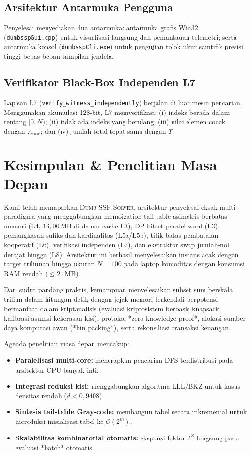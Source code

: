 \documentclass[journal,onecolumn,11pt]{IEEEtran}
\begin{document}
\subsection{Arsitektur Antarmuka Pengguna}
Penyelesai menyediakan dua antarmuka: antarmuka grafis Win32 (\texttt{dumbsspGui.cpp}) untuk visualisasi langsung dan pemantauan telemetri; serta antarmuka konsol (\texttt{dumbsspCli.exe}) untuk pengujian tolok ukur saintifik presisi tinggi bebas beban tampilan jendela.

\subsection{Verifikator Black-Box Independen L7}
Lapisan L7 (\texttt{verify\_witness\_independently}) berjalan di luar mesin pencarian. Menggunakan akumulasi 128-bit, L7 memverifikasi: (i) indeks berada dalam rentang $[0,N)$; (ii) tidak ada indeks yang berulang; (iii) nilai elemen cocok dengan $A_{\text{raw}}$; dan (iv) jumlah total tepat sama dengan $T$.

\section{Kesimpulan \& Penelitian Masa Depan}
\label{sec:conclusion}

Kami telah memaparkan \textsc{Dumb SSP Solver}, arsitektur penyelesai eksak multi-paradigma yang menggabungkan memoization tail-table asimetris berbatas memori (L4, $16{,}00$\,MB di dalam cache L3), DP bitset paralel-word (L3), pemangkasan sufiks dan kardinalitas (L5a/L5b), titik batas pembatalan kooperatif (L6), verifikasi independen (L7), dan ekstraktor swap jumlah-nol derajat hingga (L8). Arsitektur ini berhasil menyelesaikan instans acak dengan target triliunan hingga ukuran $N=100$ pada laptop komoditas dengan konsumsi RAM rendah ($\le 21$\,MB).

Dari sudut pandang praktis, kemampuan menyelesaikan subset sum berskala triliun dalam hitungan detik dengan jejak memori terkendali berpotensi bermanfaat dalam kriptanalisis (evaluasi kriptosistem berbasis knapsack, kalibrasi asumsi kekerasan kisi), protokol *zero-knowledge proof*, alokasi sumber daya komputasi awan (*bin packing*), serta rekonsiliasi transaksi keuangan.

Agenda penelitian masa depan mencakup:
\begin{itemize}
    \item \textbf{Paralelisasi multi-core:} menerapkan pencarian DFS terdistribusi pada arsitektur CPU banyak-inti.
    \item \textbf{Integrasi reduksi kisi:} menggabungkan algoritma LLL/BKZ untuk kasus densitas rendah ($d < 0{,}9408$).
    \item \textbf{Sintesis tail-table Gray-code:} membangun tabel secara inkremental untuk mereduksi inisialisasi tabel ke $\mathcal{O}(2^m)$.
    \item \textbf{Skalabilitas kombinatorial otomatis:} ekspansi faktor $2^Z$ langsung pada evaluasi *batch* otomatis.
\end{itemize}



\end{document}
